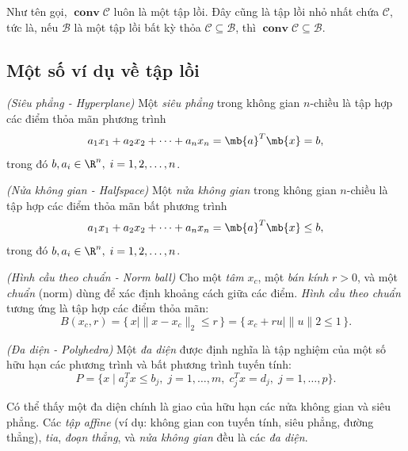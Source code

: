Như tên gọi, \( \operatorname{\textbf{conv}} \mathcal{C} \) luôn là một tập lồi. Đây cũng là tập lồi nhỏ nhất chứa \( \mathcal{C} \), tức là, nếu \( \mathcal{B} \) là một tập lồi bất kỳ thỏa \( \mathcal{C} \subseteq \mathcal{B} \), thì \( \operatorname{\textbf{conv}} \mathcal{C} \subseteq \mathcal{B} \).

\subsection{Một số ví dụ về tập lồi}
\begin{define}\textit{(Siêu phẳng - Hyperplane)}
    \label{define:hyperplane}
    Một \textit{siêu phẳng} trong không gian \( n \)-chiều là tập hợp các điểm thỏa mãn phương trình
    \[
    a_1 x_1 + a_2 x_2 + \cdots + a_n x_n = \mb{a}^T \mb{x} = b,
    \]
    trong đó \( b, a_i \in \R^{n}, \; i = 1, 2, \ldots, n \).
\end{define}

\begin{define}\textit{(Nửa không gian - Halfspace)}
    \label{define:halfspace}
    Một \textit{nửa không gian} trong không gian \( n \)-chiều là tập hợp các điểm thỏa mãn bất phương trình
    \[
    a_1 x_1 + a_2 x_2 + \cdots + a_n x_n = \mb{a}^T \mb{x} \leq b,
    \]
    trong đó \( b, a_i \in \R^{n}, \; i = 1, 2, \ldots, n \).
\end{define}

\begin{define}\textit{(Hình cầu theo chuẩn - Norm ball)}
    \label{define:norm_ball}
    Cho một \textit{tâm} \( x_c \), một \textit{bán kính} \( r > 0 \), 
    và một \textit{chuẩn} (norm) dùng để xác định khoảng cách giữa các điểm. 
    \textit{Hình cầu theo chuẩn} tương ứng là tập hợp các điểm thỏa mãn:
    \[
    B(x_c, r) = \{\, x \mid \|x - x_c\|_2 \leq r \,\}
    = \{\, x_c + r u \mid \|u\|2 \leq 1 \,\}.
    \]
\end{define}

\begin{define}\textit{(Đa diện - Polyhedra)}
    \label{define:polyhedra}
    Một \textit{đa diện} được định nghĩa là tập nghiệm của một số hữu hạn các phương trình và bất phương trình tuyến tính:
    \[
    P = \{x \mid a_j^T x \le b_j, \; j = 1, \ldots, m, \; c_j^T x = d_j, \; j = 1, \ldots, p \}. \tag{2.5}
    \]
\end{define}

\noindent Có thể thấy một đa diện chính là giao của hữu hạn các nửa không gian và siêu phẳng. Các \textit{tập affine} (ví dụ: không gian con tuyến tính, siêu phẳng, đường thẳng), \textit{tia}, \textit{đoạn thẳng}, và \textit{nửa không gian} đều là các \textit{đa diện}.


